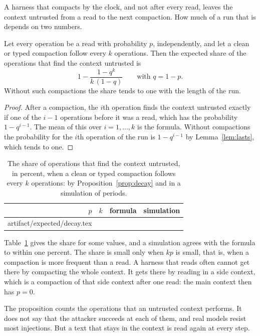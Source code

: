 \documentclass[acmsmall,nonacm,screen]{acmart}
\makeatletter
\newcommand{\claim}[2]{#2}
\newcommand{\rows}[1]{\@@input artifact/expected/#1.tex }
\makeatother
\begin{document}
A harness that compacts by the clock, and not after every read, leaves the context untrusted
from a read to the next compaction. How much of a run that is depends on two numbers.

\begin{proposition}[Decay]
\label{prop:decay}
Let every operation be a read with probability $p$, independently, and let a clean or typed
compaction follow every $k$ operations. Then the expected share of the operations that find
the context untrusted is
\[
  1 - \frac{1 - q^{k}}{k\,(1 - q)} \qquad \text{with } q = 1 - p .
\]
Without such compactions the share tends to one with the length of the run.
\end{proposition}

\begin{proof}
After a compaction, the $i$th operation finds the context untrusted exactly if one of the
$i - 1$ operations before it was a read, which has the probability $1 - q^{i-1}$. The mean of
this over $i = 1, \ldots, k$ is the formula. Without compactions the probability for the
$i$th operation of the run is $1 - q^{i-1}$ by Lemma~\ref{lem:lasts}, which tends to one.
\end{proof}

\begin{table}
\caption{The share of operations that find the context untrusted, in percent, when a clean
or typed compaction follows every $k$ operations: by Proposition~\ref{prop:decay} and in a
simulation of \exDecayPeriods{} periods.}
\label{tab:decay}
\begin{tabular}{rrrr}
\toprule
$p$ & $k$ & formula & simulation \\
\midrule
\rows{decay}
\bottomrule
\end{tabular}
\end{table}

\claim{decay}{Table~\ref{tab:decay} gives the share for some values, and a simulation agrees
with the formula to within one percent.} The share is small only when $k p$ is small, that
is, when a compaction is more frequent than a read. A harness that reads often cannot get
there by compacting the whole context. It gets there by reading in a side context, which is
a compaction of that side context after one read: the main context then has $p = 0$.

The proposition counts the operations that an untrusted context performs. It does not say
that the attacker succeeds at each of them, and real models resist most injections. But a
text that stays in the context is read again at every step.
\end{document}
